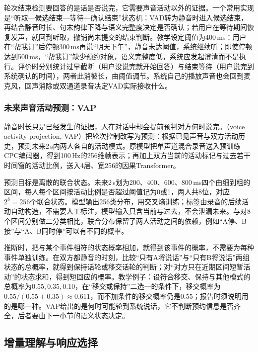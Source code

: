 轮次结束检测要回答的是话是否说完，它需要声音活动以外的证据。一个常用实现是“听取—候选结束—等待—确认结束”状态机：VAD转为静音时进入候选结束，再结合静音时长、句末韵律下降与语义完整度决定是否确认；若用户在等待期间恢复发声，就回到听取，撤销尚未提交的结束判断。教学设定阈值为400\,ms：用户在“帮我订”后停顿300\,ms再说“明天下午”，静音未达阈值，系统继续听；即使停顿达到500\,ms，“帮我订”缺少预约对象，语义完整度低，系统应发起澄清而不是执行。评价时分别统计过早截断（用户没说完就开始回答）与结束等待（用户说完到系统确认的时间），两者此消彼长，由阈值调节。系统自己的播放声音也会回到麦克风，回声消除或双通道录音决定VAD实际接收什么。

\subsubsection{未来声音活动预测：VAP}
\label{sec:nlp-speech-vap}

静音时长只是已经发生的证据，人在对话中却会提前预判对方何时说完。（voice activity projection, VAP）把轮次控制改写为预测：根据已见声音与双方活动历史，预测未来2\,s内两人各自的活动模式。原模型把单声道混合录音送入预训练CPC编码器，得到100\,Hz的256维帧表示；再加上双方当前的活动标记与过去若干时间窗的活动比例，送入4层、宽256的因果Transformer。

预测目标是离散的联合状态。未来2\,s划为200、400、600、800\,ms四个由细到粗的区间，每人每个区间按活动比例是否超过阈值记为0或1，两人共8位，对应$2^8=256$个联合状态。模型输出256类分布，用交叉熵训练；标签由录音的后续活动自动构造，不需要人工标注，模型输入只含当前与过去，不会泄漏未来。与对8个区间分别做二分类相比，联合分布保留了两人活动之间的依赖，例如“A停、B接”与“A、B同时停”可以有不同的概率。

推断时，把与某个事件相符的状态概率相加，就得到该事件的概率，不需要为每种事件单独训练。在双方都静音的时刻，比较“只有A将说话”与“只有B将说话”两组状态的总概率，就得到保持话轮或移交话轮的判断；对“对方只在近期区间短暂活动”的状态求和，得到短回应的概率。教学例子：设符合移交、保持与其他模式的总概率为$0.55,0.35,0.10$，在“移交或保持”二选一的条件下，移交概率为$0.55/(0.55+0.35)\approx0.611$，而不加条件的移交概率仍是$0.55$；报告时须说明用的是哪一种。VAP给出的是何时可能轮到系统说话，它不判断预约信息是否齐全，后者要由下一小节的语义状态决定。

\subsection{增量理解与响应选择}
\label{sec:nlp-speech-incremental-understanding}

